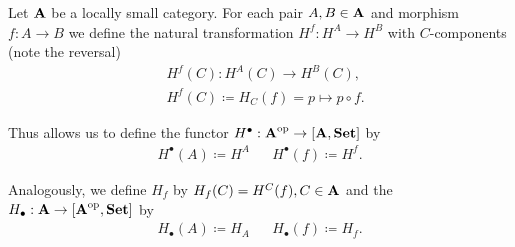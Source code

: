 \begin{definition}\label{def:yoneda_embedding}\cite[definitions 4.1.15, 4.1.21]{Leinster2014}
  Let \( \operatorname{\mathbf{A}} \) be a locally small category. For each pair \( A, B \in \operatorname{\mathbf{A}} \) and morphism \( f: A \to B \) we define the natural transformation \( H^f: H^A \to H^B \) with \( C \)-components (note the reversal)
  \begin{align*}
    &H^f(C): H^A(C) \to H^B(C), \\
    &H^f(C) \coloneqq H_C(f) = p \mapsto p \circ f.
  \end{align*}

  Thus allows us to define the functor \( H^\bullet: \operatorname{\mathbf{A}}^{\operatorname{op}} \to [\operatorname{\mathbf{A}}, \operatorname{\mathbf{Set}}] \) by
  \begin{align*}
    H^\bullet(A) \coloneqq H^A && H^\bullet(f) \coloneqq H^f.
  \end{align*}

  Analogously, we define \( H_f \) by \( H_f(C) = H^C(f), C \in \operatorname{\mathbf{A}} \) and the  \( H_\bullet: \operatorname{\mathbf{A}} \to [\operatorname{\mathbf{A}}^{\operatorname{op}}, \operatorname{\mathbf{Set}}] \) by
  \begin{align*}
    H_\bullet(A) \coloneqq H_A && H_\bullet(f) \coloneqq H_f.
  \end{align*}
\end{definition}

